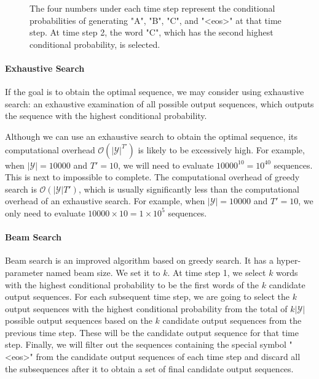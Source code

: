 \begin{figure}[hpt]
	\centering
	
	\caption{The four numbers under each time step represent the conditional probabilities of generating "A", "B", "C", and "<eos>" at that time step.  At time step 2, the word "C", which has the second highest conditional probability, is selected.}
	\label{fig:s2s_prob2}
\end{figure}

\paragraph{Exhaustive Search}

If the goal is to obtain the optimal sequence, we may consider using exhaustive search: an exhaustive examination of all possible output sequences, which outputs the sequence with the highest conditional probability.

Although we can use an exhaustive search to obtain the optimal sequence, its computational overhead $\mathcal{O}(\left|\mathcal{Y}\right|^{T'})$ is likely to be excessively high. For example, when $|\mathcal{Y}|=10000$ and $T'=10$, we will need to evaluate $10000^{10} = 10^{40}$ sequences. This is next to impossible to complete. The computational overhead of greedy search is $\mathcal{O}(\left|\mathcal{Y}\right|T')$, which is usually significantly less than the computational overhead of an exhaustive search. For example, when $|\mathcal{Y}|=10000$ and $T'=10$, we only need to evaluate $10000\times10=1\times10^5$ sequences.

\paragraph{Beam Search}

Beam search is an improved algorithm based on greedy search. It has a hyper-parameter named beam size. We set it to $k$. At time step 1, we select $k$ words with the highest conditional probability to be the first words of the $k$ candidate output sequences. For each subsequent time step, we are going to select the $k$ output sequences with the highest conditional probability from the total of $k\left|\mathcal{Y}\right|$ possible output sequences based on the $k$ candidate output sequences from the previous time step. These will be the candidate output sequence for that time step. Finally, we will filter out the sequences containing the special symbol "<eos>" from the candidate output sequences of each time step and discard all the subsequences after it to obtain a set of final candidate output sequences.

